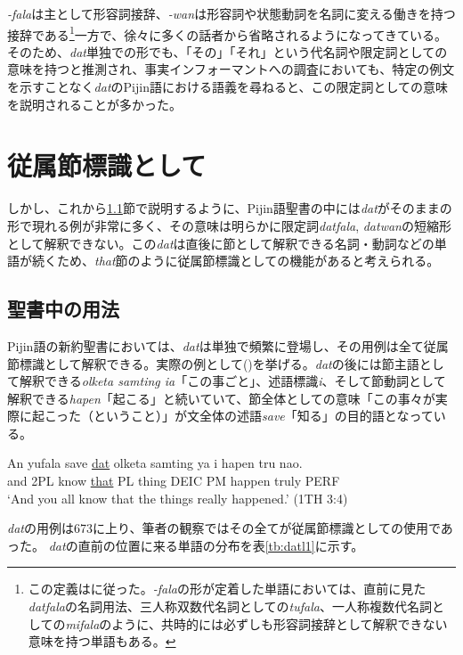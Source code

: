 \textit{-fala}は主として形容詞接辞、\textit{-wan}は形容詞や状態動詞を名詞に変える働きを持つ接辞である\footnote{
この定義は\cite{syntax}に従った。\textit{-fala}の形が定着した単語においては、直前に見た\textit{datfala}の名詞用法、三人称双数代名詞としての\textit{tufala}、一人称複数代名詞としての\textit{mifala}のように、共時的には必ずしも形容詞接辞として解釈できない意味を持つ単語もある。}一方で、徐々に多くの話者から省略されるようになってきている\citep{syntax}。
そのため、\textit{dat}単独での形でも、「その」「それ」という代名詞や限定詞としての意味を持つと推測され、事実インフォーマントへの調査においても、特定の例文を示すことなく\textit{dat}のPijin語における語義を尋ねると、この限定詞としての意味を説明されることが多かった。

\section{従属節標識として}

しかし、これから\ref{sec:datbib}節で説明するように、Pijin語聖書の中には\textit{dat}がそのままの形で現れる例が非常に多く、その意味は明らかに限定詞\textit{datfala}, \textit{datwan}の短縮形として解釈できない。この\textit{dat}は直後に節として解釈できる名詞・動詞などの単語が続くため、\textit{that}節のように従属節標識としての機能があると考えられる。

\subsection{聖書中の用法}\label{sec:datbib}
Pijin語の新約聖書においては、\textit{dat}は単独で頻繁に登場し、その用例は全て従属節標識として解釈できる。実際の例として()を挙げる。\textit{dat}の後には節主語として解釈できる\textit{olketa samting ia}「この事ごと」、述語標識\textit{i}、そして節動詞として解釈できる\textit{hapen}「起こる」と続いていて、節全体としての意味「この事々が実際に起こった（ということ）」が文全体の述語\textit{save}「知る」の目的語となっている。

\begin{exe}
\ex
\gll An yufala save \underline{dat} olketa samting ya i hapen tru nao.\\
and 2PL know \underline{that} PL thing DEIC PM happen truly PERF\\
\glt `And you all know that the things really happened.' (1TH 3:4)
\end{exe}

\textit{dat}の用例は673に上り、筆者の観察ではその全てが従属節標識としての使用であった。
\textit{dat}の直前の位置に来る単語の分布を表\ref{tb:datl1}に示す。

